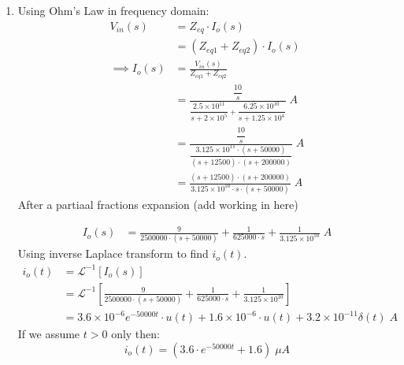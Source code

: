 \begin{enumerate}
	\item{
		Using Ohm's Law in frequency domain:
		\begin{align*}
		V_{in}(s) &= Z_{eq} \cdot I_o(s)\\
		&= (Z_{eq1} + Z_{eq2}) \cdot I_o(s)\\
		\implies I_o(s) &= \frac{V_{in}(s)}{Z_{eq1} + Z_{eq2}}\\
		&= \frac{\dfrac{10}{s}} 
		{\dfrac{2.5 \times 10^{11}}
		{s + 2 \times 10^5} + \dfrac{6.25 \times 10^{10}}{s + 1.25 \times 10^4}} \; A\\
		&= \frac{\dfrac{10}{s}} 
		{\dfrac{3.125 \times 10^{11} \cdot (s + 50000)}{(s+12500)\cdot(s+200000)}} \; A\\
		&= \frac{(s+12500)\cdot(s+200000)}{3.125 \times 10^{10} \cdot s \cdot (s + 50000)} \; A
		\end{align*}
		After a partiaal fractions expansion (add working in here)
		
		\begin{align*}
		I_o(s) &= \frac{9}{2500000 \cdot(s+50000)} + \frac{1}{625000 \cdot s} 
		+ \frac{1}{3.125 \times 10^{10}} \; A
		\end{align*}
		Using inverse Laplace transform to find $i_o(t)$.
		\begin{align*}
		i_o(t) &= \mathcal{L}^{-1}\left[ I_o(s) \right]\\
		&= \mathcal{L}^{-1} \left[ \frac{9}{2500000 \cdot(s+50000)} 
		+ \frac{1}{625000 \cdot s} + \frac{1}{3.125 \times 10^{10}} \right]\\
		&= 3.6 \times 10^{-6} e^{-50000t} \cdot u(t) + 1.6 \times 10^{-6} \cdot u(t) + 3.2 \times 10^{-11} \delta(t) \; A
		\end{align*}
		If we assume $t>0$ only then:
		$$ i_o(t) = (3.6 \cdot e^{-50000t} + 1.6) \; \mu A $$
	}

\end{enumerate}
